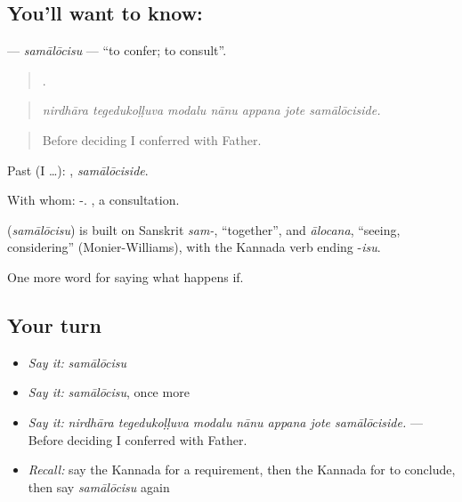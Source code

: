 \subsection*{You'll want to know: }
\textbf{} — \emph{samālōcisu} — \textquotedblleft{}to confer; to consult\textquotedblright{}.

\begin{quote}
      .
\end{quote}

\begin{quote}
\emph{nirdhāra tegedukoḷḷuva modalu nānu appana jote samālōciside.}
\end{quote}

\begin{quote}
Before deciding I conferred with Father.
\end{quote}

Past (I …): , \emph{samālōciside}.

With whom: -. , a consultation.

\begin{cousinweb}
\textbf{} (\emph{samālōcisu}) is built on Sanskrit \emph{sam-}, \textquotedblleft{}together\textquotedblright{}, and \emph{ālocana}, \textquotedblleft{}seeing, considering\textquotedblright{} (Monier-Williams), with the Kannada verb ending -\emph{isu}.
\end{cousinweb}

\begin{grammarlens}[title={What you've built}]
One more word for saying what happens if.
\end{grammarlens}

\subsection*{Your turn}
\begin{itemize}
\raggedright
  \item \emph{Say it:} \emph{samālōcisu}
  \item \emph{Say it:} \emph{samālōcisu}, once more
  \item \emph{Say it:} \emph{nirdhāra tegedukoḷḷuva modalu nānu appana jote samālōciside.} — Before deciding I conferred with Father.
  \item \emph{Recall:} say the Kannada for a requirement, then the Kannada for to conclude, then say \emph{samālōcisu} again
\end{itemize}

